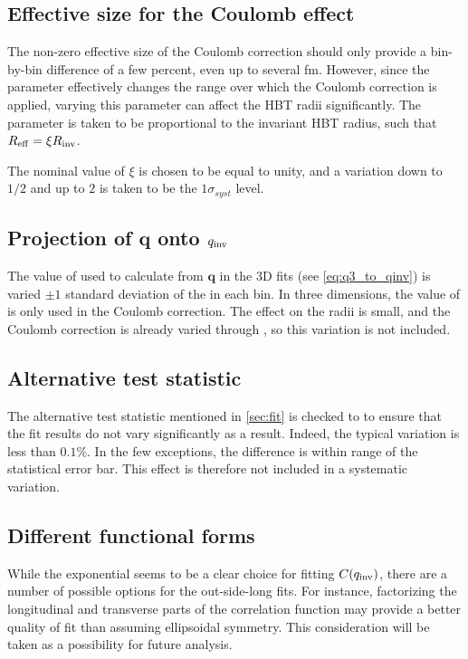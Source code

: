 \subsection{Effective size for the Coulomb effect}
The non-zero effective size of the Coulomb correction \Reff should only provide a bin-by-bin difference of a few percent, even up to several fm.
However, since the parameter effectively changes the \qinv range over which the Coulomb correction is applied, varying this parameter can affect the HBT radii significantly.
The parameter \Reff is taken to be proportional to the invariant HBT radius, such that $R_{\mathrm{eff}} = \xi R_{\mathrm{inv}}$.

The nominal value of $\xi$ is chosen to be equal to unity, and a variation down to $1/2$ and up to $2$ is taken to be the $1\sigma_{syst}$ level.

\subsection{Projection of $\mathbf{q}$ onto $q_{\mathrm{inv}}$}
The value of \kt used to calculate \qinv from $\mathbf{q}$ in the 3D fits (see \cref{eq:q3_to_qinv}) is varied $\pm 1$ standard deviation of the \kt in each bin.
In three dimensions, the value of \qinv is only used in the Coulomb correction.
The effect on the radii is small, and the Coulomb correction is already varied through \Reff, so this variation is not included.


\subsection{Alternative test statistic}
The alternative test statistic mentioned in \cref{sec:fit} is checked to to ensure that the fit results do not vary significantly as a result.
Indeed, the typical variation is less than $0.1\%$.
In the few exceptions, the difference is within range of the statistical error bar.
This effect is therefore not included in a systematic variation.

\subsection{Different functional forms}
While the exponential seems to be a clear choice for fitting $C(q_{\mathrm{inv}})$, there are a number of possible options for the out-side-long fits.
For instance, factorizing the longitudinal and transverse parts of the correlation function may provide a better quality of fit than assuming ellipsoidal symmetry.
This consideration will be taken as a possibility for future analysis.

